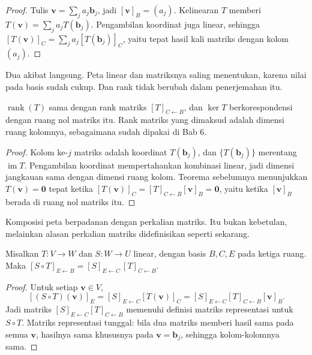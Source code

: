 \begin{proof}
Tulis $\mathbf{v}=\sum_{j}a_{j}\mathbf{b}_{j}$, jadi $[\mathbf{v}]_{B}=(a_{j})$. Kelinearan
$T$ memberi $T(\mathbf{v})=\sum_{j}a_{j}T(\mathbf{b}_{j})$. Pengambilan koordinat juga
linear,
sehingga $[T(\mathbf{v})]_{C}=\sum_{j}a_{j}[T(\mathbf{b}_{j})]_{C}$, yaitu tepat hasil kali
matriks dengan kolom $(a_{j})$.
\end{proof}

Dua akibat langsung. Peta linear dan matriksnya saling menentukan, karena nilai pada
basis sudah cukup. Dan rank tidak berubah dalam penerjemahan itu.

\begin{proposisi}
$\operatorname{rank}(T)$ sama dengan rank matriks $[T]_{C\leftarrow B}$, dan $\ker T$
berkorespondensi dengan ruang nol matriks itu. Rank matriks yang dimaksud adalah dimensi
ruang
kolomnya, sebagaimana sudah dipakai di Bab 6.
\end{proposisi}

\begin{proof}
Kolom ke-$j$ matriks adalah koordinat $T(\mathbf{b}_{j})$, dan
$\{T(\mathbf{b}_{j})\}$ merentang $\operatorname{im}T$. Pengambilan koordinat mempertahankan
kombinasi linear, jadi dimensi jangkauan sama dengan dimensi ruang kolom. Teorema sebelumnya
menunjukkan $T(\mathbf{v})=\mathbf{0}$ tepat ketika $[T(\mathbf{v})]_{C}=[T]_{C\leftarrow B}[\mathbf{v}]_{B}=\mathbf{0}$,
yaitu ketika $[\mathbf{v}]_{B}$ berada di ruang nol matriks itu.
\end{proof}

Komposisi peta berpadanan dengan perkalian matriks. Itu bukan kebetulan, melainkan
alasan perkalian matriks didefinisikan seperti sekarang.

\begin{teorema}
Misalkan $T\colon V\to W$ dan $S\colon W\to U$ linear, dengan basis $B,C,E$ pada ketiga ruang.
Maka $[S\circ T]_{E\leftarrow B}=[S]_{E\leftarrow C}\,[T]_{C\leftarrow B}$.
\end{teorema}

\begin{proof}
Untuk setiap $\mathbf{v}\in V$,
\[
  [(S\circ T)(\mathbf{v})]_{E}
  =[S]_{E\leftarrow C}[T(\mathbf{v})]_{C}
  =[S]_{E\leftarrow C}[T]_{C\leftarrow B}[\mathbf{v}]_{B}.
\]
Jadi matriks $[S]_{E\leftarrow C}[T]_{C\leftarrow B}$ memenuhi definisi matriks representasi
untuk $S\circ T$. Matriks representasi tunggal: bila dua matriks memberi hasil sama pada
semua $\mathbf{v}$, hasilnya sama khususnya pada $\mathbf{v}=\mathbf{b}_{j}$, sehingga
kolom-kolomnya sama.
\end{proof}

